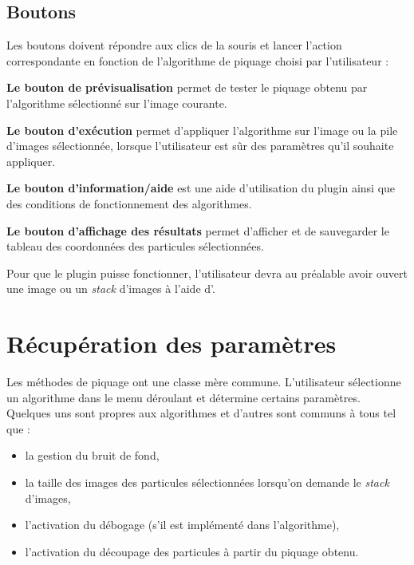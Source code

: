 \subsection{Boutons}

Les boutons doivent répondre aux clics de la souris et lancer l'action correspondante en fonction de l'algorithme de piquage choisi par l'utilisateur :

\begin{description}
\item \textbf{Le bouton de prévisualisation} permet de tester le piquage obtenu par l'algorithme sélectionné sur l'image courante.
\item \textbf{Le bouton d'exécution} permet d'appliquer l'algorithme sur l'image ou la pile d'images sélectionnée, lorsque l'utilisateur est s\^ur des paramètres qu'il souhaite appliquer.
\item \textbf{Le bouton d'information/aide} est une aide d'utilisation du plugin ainsi que des conditions de fonctionnement des algorithmes.
\item \textbf{Le bouton d'affichage des résultats} permet d'afficher et de sauvegarder le tableau des coordonnées des particules sélectionnées.%
\end{description}
Pour que le plugin puisse fonctionner, l'utilisateur devra au préalable avoir ouvert une image ou un \textit{stack} d'images à l'aide d'\imj.
\pagebreak

\section{Récupération des paramètres}

Les méthodes de piquage ont une classe mère commune. L'utilisateur sélectionne un algorithme dans le menu déroulant et détermine certains paramètres. Quelques uns sont propres aux algorithmes et d'autres sont communs à tous tel que :

\begin{itemize}
\item la gestion du bruit de fond,
\item la taille des images des particules sélectionnées lorsqu'on demande le \textit{stack} d'images,
\item l'activation du débogage (s'il est implémenté dans l'algorithme),
\item l'activation du découpage des particules à partir du piquage obtenu.
\end{itemize}

